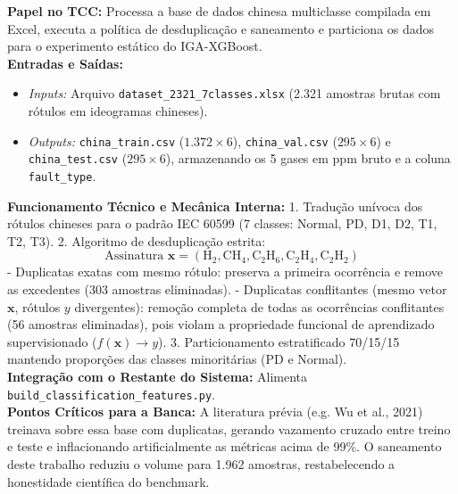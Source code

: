 \documentclass[10pt,a4paper]{article}
\begin{document}
\begin{filebox}
\textbf{Papel no TCC:} Processa a base de dados chinesa multiclasse compilada em Excel, executa a política de desduplicação e saneamento e particiona os dados para o experimento estático do IGA-XGBoost.\\
\textbf{Entradas e Saídas:}
\begin{itemize}[leftmargin=*,itemsep=1pt]
  \item \textit{Inputs:} Arquivo \texttt{dataset\_2321\_7classes.xlsx} (2.321 amostras brutas com rótulos em ideogramas chineses).
  \item \textit{Outputs:} \texttt{china\_train.csv} ($1.372 \times 6$), \texttt{china\_val.csv} ($295 \times 6$) e \texttt{china\_test.csv} ($295 \times 6$), armazenando os 5 gases em ppm bruto e a coluna \texttt{fault\_type}.
\end{itemize}
\textbf{Funcionamento Técnico e Mecânica Interna:} 
1. Tradução unívoca dos rótulos chineses para o padrão IEC 60599 (7 classes: Normal, PD, D1, D2, T1, T2, T3).
2. Algoritmo de desduplicação estrita:
   $$\text{Assinatura } \mathbf{x} = (\text{H}_2, \text{CH}_4, \text{C}_2\text{H}_6, \text{C}_2\text{H}_4, \text{C}_2\text{H}_2)$$
   - Duplicatas exatas com mesmo rótulo: preserva a primeira ocorrência e remove as excedentes (303 amostras eliminadas).
   - Duplicatas conflitantes (mesmo vetor $\mathbf{x}$, rótulos $y$ divergentes): remoção completa de todas as ocorrências conflitantes (56 amostras eliminadas), pois violam a propriedade funcional de aprendizado supervisionado ($f(\mathbf{x}) \to y$).
3. Particionamento estratificado 70/15/15 mantendo proporções das classes minoritárias (PD e Normal).\\
\textbf{Integração com o Restante do Sistema:} Alimenta \texttt{build\_classification\_features.py}.\\
\textbf{Pontos Críticos para a Banca:} A literatura prévia (e.g. Wu et al., 2021) treinava sobre essa base com duplicatas, gerando vazamento cruzado entre treino e teste e inflacionando artificialmente as métricas acima de 99\%. O saneamento deste trabalho reduziu o volume para 1.962 amostras, restabelecendo a honestidade científica do benchmark.
\end{filebox}
\end{document}
